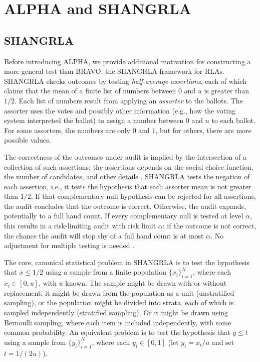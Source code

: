 \documentclass[12pt,runningheads]{llncs}
\begin{document}
{\section{ALPHA and SHANGRLA}

\subsection{SHANGRLA} \label{sec:shangrla}
Before introducing ALPHA, we provide additional motivation for constructing a more general test than BRAVO: 
the SHANGRLA framework for RLAs.
SHANGRLA \cite{stark20} checks outcomes by testing \emph{half-average assertions}, each of which claims 
that the mean of a finite list of
numbers between $0$ and $u$ is greater than $1/2$.
Each list of numbers result from applying an \emph{assorter} to the ballots.
The assorter uses the votes and possibly other information (e.g., how the voting system interpreted the ballot)
to assign a number between $0$ and $u$ to each ballot.
For some assorters, the numbers are only $0$ and $1$, but for others, there are more possible values.

The correctness of the outcomes under audit is implied by the intersection of a collection of such assertions;
the assertions depends on the social choice function, the number of candidates, and other details \cite{stark20}.
SHANGRLA tests the negation of each assertion, i.e., it tests the
hypothesis that each assorter mean is not greater than $1/2$.
If that complementary null hypothesis can be rejected for all assertions,
the audit concludes that the outcome is correct.
Otherwise, the audit expands, potentially to a full hand count.
If every complementary null is tested at level $\alpha$, this results in a risk-limiting
audit with risk limit $\alpha$: if the outcome is not correct, the chance the audit will stop
shy of a full hand count is at most $\alpha$.
No adjustment for multiple testing is needed \cite{stark20}.

The core, canonical statistical problem in SHANGRLA is to test the hypothesis that $\bar{x} \le 1/2$ using a 
sample from a finite population $\{x_i\}_{i=1}^N$, 
where each $x_i \in [0, u]$, with $u$ known.
The sample might be drawn with or without replacement; it might be drawn from the population as a unit (unstratified sampling), or the population might be divided into strata, each of which is sampled independently (stratified sampling).
Or it might be drawn using Bernoulli sampling, where each item is included independently, with some common probability.
An equivalent problem is to test the hypothesis that 
$\bar{y} \le t$ using a sample from $\{y_i\}_{i=1}^N$, where each $y_i \in [0, 1]$ (let $y_i = x_i/u$ and set $t=1/(2u)$).

}
\end{document}
